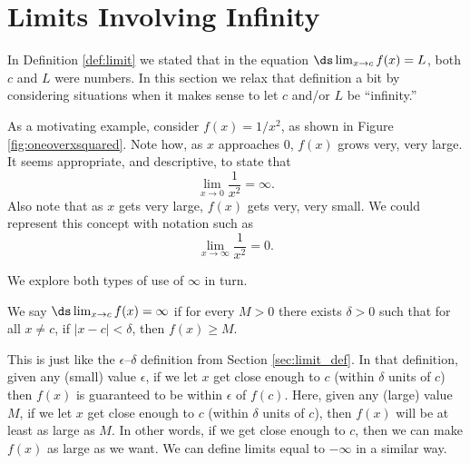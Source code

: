\section{Limits Involving Infinity}\label{sec:limits_infty}

In Definition \ref{def:limit} we stated that in the equation $\ds \lim_{x\to c}f(x) = L$, both $c$ and $L$ were numbers. In this section we relax that definition a bit by considering situations when it makes sense to let $c$ and/or $L$ be ``infinity.''

As a motivating example, consider $f(x) = 1/x^2$, as shown in Figure \ref{fig:oneoverxsquared}. Note how, as $x$ approaches 0, $f(x)$ grows very, very large. It seems appropriate, and descriptive, to state that $$\lim_{x\rightarrow 0} \frac1{x^2}=\infty.$$ Also note that as $x$ gets very large, $f(x)$ gets very, very small. We could represent this concept with notation such as $$\lim_{x\rightarrow \infty} \frac1{x^2}=0.$$


We explore both types of use of $\infty$ in turn.


%

{We say $\ds \lim_{x\rightarrow c} f(x)=\infty$ if for every $M>0$ there exists $\delta>0$ such that for all $x\neq c$, if  $|x-c|<\delta$, then $f(x)\geq M$.   
}

This is just like the $\epsilon$--$\delta$ definition from Section \ref{sec:limit_def}.  In that definition, given any (small) value $\epsilon$, if we let $x$ get close enough to $c$ (within $\delta$ units of $c$) then $f(x)$ is guaranteed to be within $\epsilon$ of $f(c)$.  Here, given any (large) value $M$, if we let $x$ get close enough to $c$ (within $\delta$ units of $c$), then $f(x)$ will be at least as large as $M$.  In other words, if we get close enough to $c$, then we can make $f(x)$ as large as we want.  We can define limits equal to $-\infty$ in a similar way.

